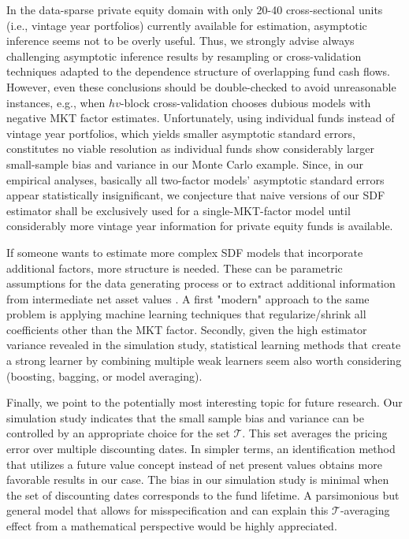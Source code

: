 \documentclass[12pt]{article}
\begin{document}
In the data-sparse private equity domain with only 20-40 cross-sectional units (i.e., vintage year portfolios) currently available for estimation, asymptotic inference seems not to be overly useful.
Thus, we strongly advise always challenging asymptotic inference results by resampling or cross-validation techniques adapted to the dependence structure of overlapping fund cash flows.
However, even these conclusions should be double-checked to avoid unreasonable instances, e.g., when $hv$-block cross-validation chooses dubious models with negative MKT factor estimates.
Unfortunately, using individual funds instead of vintage year portfolios, which yields smaller asymptotic standard errors, constitutes no viable resolution as individual funds show considerably larger small-sample bias and variance in our Monte Carlo example.
Since, in our empirical analyses, basically all two-factor models' asymptotic standard errors appear statistically insignificant, we conjecture that naive versions of our SDF estimator shall be exclusively used for a single-MKT-factor model until considerably more vintage year information for private equity funds is available.

If someone wants to estimate more complex SDF models that incorporate additional factors, more structure is needed.
These can be parametric assumptions for the data generating process \citep{ACGP18} or to extract additional information from intermediate net asset values \citep{GSW19,BGG20}.
A first "modern" approach to the same problem is applying machine learning techniques that regularize/shrink all coefficients other than the MKT factor.
Secondly, given the high estimator variance revealed in the simulation study, statistical learning methods that create a strong learner by combining multiple weak learners seem also worth considering (boosting, bagging, or model averaging).


Finally, we point to the potentially most interesting topic for future research.
Our simulation study indicates that the small sample bias and variance can be controlled by an appropriate choice for the set $\mathcal{T}$.
This set averages the pricing error over multiple discounting dates.
In simpler terms, an identification method that utilizes a future value concept instead of net present values obtains more favorable results in our case.
The bias in our simulation study is minimal when the set of discounting dates corresponds to the fund lifetime.
A parsimonious but general model that allows for misspecification and can explain this $\mathcal{T}$-averaging effect from a mathematical perspective would be highly appreciated.






\appendix

%
%
%

\end{document}
